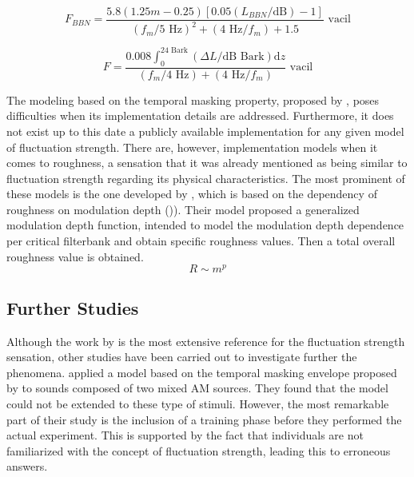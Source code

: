 \documentclass[../main.tex]{subfiles}
\begin{document}
\begin{theoreticalbackground}
\begin{equation}
    F_{BBN} = \frac{5.8(1.25m-0.25)[0.05(L_{BBN}/\text{dB})-1]}
        {(f_{m}/5\text{ Hz})^2+(4\text{ Hz}/f_{m})+1.5} \text{ vacil}
    \label{eq:flucstrenexbbn}
\end{equation}

\begin{equation}
    F = \frac{0.008 \int_0^{24\text{ Bark}}(\Delta L/\text{dB Bark})\mathrm{d}z}
        {(f_{m}/4\text{ Hz})+(4\text{ Hz}/f_{m})} \text{ vacil}
    \label{eq:flucstrenexamfm}
\end{equation}

The modeling based on the temporal masking property, proposed by
\citeauthor{Fastl2007Psychoacoustics}, poses difficulties when its
implementation details are addressed. Furthermore, it does not exist up to this
date a publicly available implementation for any given model of fluctuation
strength. There are, however, implementation models when it comes to roughness,
a sensation that it was already mentioned as being similar to fluctuation
strength regarding its physical characteristics. The most prominent of these
models is the one developed by \citeauthor{daniel1997psychoacoustical}
\cite{daniel1997psychoacoustical}, which is based on the dependency of roughness
on modulation depth ()). Their model proposed a generalized
modulation depth function, intended to model the modulation depth dependence
per critical filterbank and obtain specific roughness values. Then a total
overall roughness value is obtained.
\begin{equation}
   R \sim m^p
   \label{eq:R}
\end{equation}

\subsection{Further Studies}

Although the work by \citeauthor{Fastl2007Psychoacoustics} is the most extensive
reference for the fluctuation strength sensation, other studies have been
carried out to investigate further the phenomena.
\citeauthor{Accolti2009Fluctuation} applied a model based on the temporal
masking envelope proposed by \citeauthor{Fastl2007Psychoacoustics} to sounds
composed of two mixed \gls{AM} sources. They found that the model could not be
extended to these type of stimuli. However, the most remarkable part of their
study is the inclusion of a training phase before they performed the actual
experiment. This is supported by the fact that individuals are not familiarized
with the concept of fluctuation strength, leading this to erroneous answers.


\end{theoreticalbackground}
\end{document}
